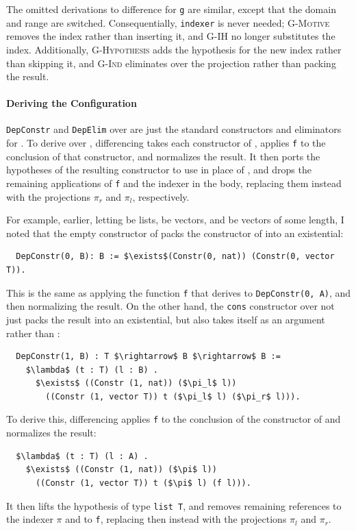 The omitted derivations to difference for \lstinline{g} are similar,
except that the domain and range are switched. Consequentially, \lstinline{indexer} is never needed;
\textsc{G-Motive} removes the index rather than inserting it, and \textsc{G-IH} no longer substitutes the index.
Additionally, \textsc{G-Hypothesis} adds the hypothesis for the new index
rather than skipping it, and \textsc{G-Ind} eliminates over the projection rather than packing the result. %

\paragraph{Deriving the Configuration}
\lstinline{DepConstr} and \lstinline{DepElim} over \Aa are just the standard constructors and eliminators for \Aa.
To derive  over \B, differencing takes each constructor of \Aa,
applies \lstinline{f} to the conclusion of that constructor, and normalizes the result. %
It then ports the hypotheses of the resulting constructor to use \B in place of \Aa, and drops the remaining applications of \lstinline{f}
and the indexer in the body, replacing them instead with the projections $\pi_r$ and $\pi_l$, respectively.

For example, earlier, letting \Aa be lists, \AI be vectors, and \B be vectors of some length,
I noted that the empty constructor of \B packs the constructor of \AI into an existential:

\begin{lstlisting}
  DepConstr(0, B): B := $\exists$(Constr(0, nat)) (Constr(0, vector T)).
\end{lstlisting}
This is the same as applying the function \lstinline{f} that \toolnamec derives to 
\lstinline{DepConstr(0, A)}, and then normalizing the result.
On the other hand, the \lstinline{cons} constructor over \B not just packs the result into an existential,
but also takes \B itself as an argument rather than \Aa:

\begin{lstlisting}
  DepConstr(1, B) : T $\rightarrow$ B $\rightarrow$ B :=
    $\lambda$ (t : T) (l : B) .
      $\exists$ ((Constr (1, nat)) ($\pi_l$ l))
        ((Constr (1, vector T)) t ($\pi_l$ l) ($\pi_r$ l))).
\end{lstlisting}
To derive this, differencing applies \lstinline{f} to the conclusion of the constructor of \Aa and normalizes the result:

\begin{lstlisting}
  $\lambda$ (t : T) (l : A) .
    $\exists$ ((Constr (1, nat)) ($\pi$ l))
      ((Constr (1, vector T)) t ($\pi$ l) (f l))).
\end{lstlisting}
It then lifts the hypothesis of type \lstinline{list T}, and removes remaining references to the indexer $\pi$ and to \lstinline{f},
replacing then instead with the projections $\pi_l$ and $\pi_r$.

